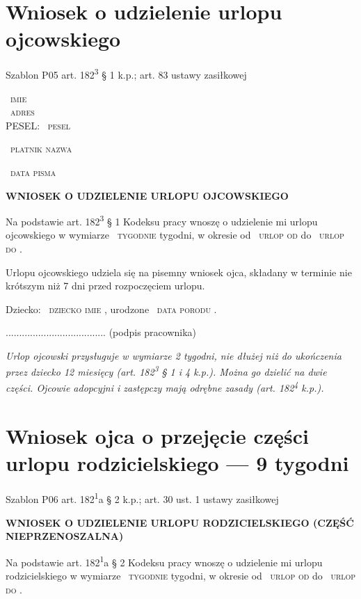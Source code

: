 \documentclass[11pt,a4paper]{article}
\newcommand{\Pole}[1]{%
  \textcolor{szary}{\dotfill}\,%
  {\scriptsize\textcolor{szary}{\textsc{#1}}}%
}
\newcommand{\NaglowekPisma}[1]{%
  \par\vspace{0.8em}%
  \begin{center}%
    {\large\bfseries\MakeUppercase{#1}}%
  \end{center}%
  \vspace{0.4em}%
}
\begin{document}
\clearpage

\section{Wniosek o udzielenie urlopu ojcowskiego}

{\small\color{szary}Szablon P05 \textbullet{} art. 182\textsuperscript{3} \S{} 1 k.p.; art. 83 ustawy zasiłkowej}

\Pole{imie}\\[-2pt]
\Pole{adres}\\[-2pt]
PESEL: \Pole{pesel}

\Pole{platnik nazwa}

\Pole{data pisma}

\NaglowekPisma{WNIOSEK O UDZIELENIE URLOPU OJCOWSKIEGO}

Na podstawie art. 182\textsuperscript{3} \S{} 1 Kodeksu pracy wnoszę o udzielenie mi urlopu
ojcowskiego w wymiarze \Pole{tygodnie} tygodni, w okresie od \Pole{urlop od} do \Pole{urlop do}.

Urlopu ojcowskiego udziela się na pisemny wniosek ojca, składany w terminie
nie krótszym niż 7 dni przed rozpoczęciem urlopu.

Dziecko: \Pole{dziecko imie}, urodzone \Pole{data porodu}.

.....................................
(podpis pracownika)

\vfill
{\footnotesize\color{szary}\itshape Urlop ojcowski przysługuje w wymiarze 2 tygodni, nie dłużej niż do ukończenia przez dziecko 12 miesięcy (art. 182\textsuperscript{3} \S{} 1 i 4 k.p.). Można go dzielić na dwie części. Ojcowie adopcyjni i zastępczy mają odrębne zasady (art. 182\textsuperscript{4} k.p.). }

\clearpage

\section{Wniosek ojca o przejęcie części urlopu rodzicielskiego --- 9 tygodni}

{\small\color{szary}Szablon P06 \textbullet{} art. 182\textsuperscript{1}a \S{} 2 k.p.; art. 30 ust. 1 ustawy zasiłkowej}

\NaglowekPisma{WNIOSEK O UDZIELENIE URLOPU RODZICIELSKIEGO (CZĘŚĆ NIEPRZENOSZALNA)}

Na podstawie art. 182\textsuperscript{1}a \S{} 2 Kodeksu pracy wnoszę o udzielenie mi urlopu
rodzicielskiego w wymiarze \Pole{tygodnie} tygodni, w okresie od \Pole{urlop od} do \Pole{urlop do}.
\end{document}
